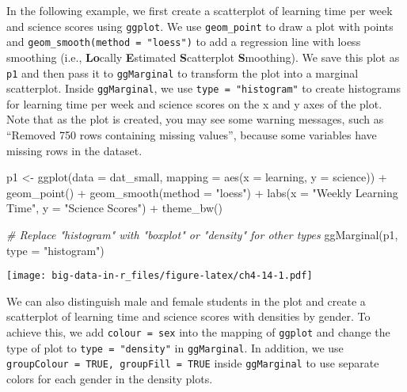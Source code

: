 \documentclass[
]{book}
\newenvironment{Shaded}{\begin{snugshade}}{\end{snugshade}}
\newcommand{\AttributeTok}[1]{\textcolor[rgb]{0.77,0.63,0.00}{#1}}
\newcommand{\CommentTok}[1]{\textcolor[rgb]{0.56,0.35,0.01}{\textit{#1}}}
\newcommand{\FunctionTok}[1]{\textcolor[rgb]{0.00,0.00,0.00}{#1}}
\newcommand{\NormalTok}[1]{#1}
\newcommand{\OtherTok}[1]{\textcolor[rgb]{0.56,0.35,0.01}{#1}}
\newcommand{\SpecialCharTok}[1]{\textcolor[rgb]{0.00,0.00,0.00}{#1}}
\newcommand{\StringTok}[1]{\textcolor[rgb]{0.31,0.60,0.02}{#1}}
\begin{document}
In the following example, we first create a scatterplot of learning time per week and science scores using \texttt{ggplot}. We use \texttt{geom\_point} to draw a plot with points and \texttt{geom\_smooth(method\ =\ "loess")} to add a regression line with loess smoothing (i.e., \textbf{Lo}cally \textbf{E}stimated \textbf{S}catterplot \textbf{S}moothing). We save this plot as \texttt{p1} and then pass it to \texttt{ggMarginal} to transform the plot into a marginal scatterplot. Inside \texttt{ggMarginal}, we use \texttt{type\ =\ "histogram"} to create histograms for learning time per week and science scores on the x and y axes of the plot. Note that as the plot is created, you may see some warning messages, such as ``Removed 750 rows containing missing values'', because some variables have missing rows in the dataset.

\begin{Shaded}
\begin{Highlighting}[]
\NormalTok{p1 }\OtherTok{\textless{}{-}} \FunctionTok{ggplot}\NormalTok{(}\AttributeTok{data =}\NormalTok{ dat\_small,}
             \AttributeTok{mapping =} \FunctionTok{aes}\NormalTok{(}\AttributeTok{x =}\NormalTok{ learning, }\AttributeTok{y =}\NormalTok{ science)) }\SpecialCharTok{+}
  \FunctionTok{geom\_point}\NormalTok{() }\SpecialCharTok{+}
  \FunctionTok{geom\_smooth}\NormalTok{(}\AttributeTok{method =} \StringTok{"loess"}\NormalTok{) }\SpecialCharTok{+}
  \FunctionTok{labs}\NormalTok{(}\AttributeTok{x =} \StringTok{"Weekly Learning Time"}\NormalTok{, }\AttributeTok{y =} \StringTok{"Science Scores"}\NormalTok{) }\SpecialCharTok{+}
  \FunctionTok{theme\_bw}\NormalTok{()}

\CommentTok{\# Replace "histogram" with "boxplot" or "density" for other types}
\FunctionTok{ggMarginal}\NormalTok{(p1, }\AttributeTok{type =} \StringTok{"histogram"}\NormalTok{)}
\end{Highlighting}
\end{Shaded}

\texttt{[image: big-data-in-r\_files/figure-latex/ch4-14-1.pdf]}

We can also distinguish male and female students in the plot and create a scatterplot of learning time and science scores with densities by gender. To achieve this, we add \texttt{colour\ =\ sex} into the mapping of \texttt{ggplot} and change the type of plot to \texttt{type\ =\ "density"} in \texttt{ggMarginal}. In addition, we use \texttt{groupColour\ =\ TRUE,\ groupFill\ =\ TRUE} inside \texttt{ggMarginal} to use separate colors for each gender in the density plots.
\end{document}
